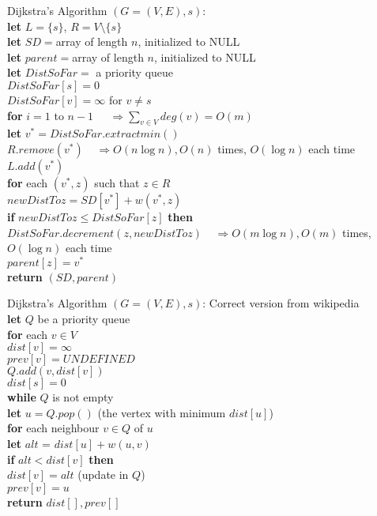 \documentclass[twoside]{article}
\newcommand{\pc}[1]{\mbox{\textbf{#1}}} %
\begin{document}
\begin{algorithme}
	Dijkstra's Algorithm $(G = (V, E), s)$: \\
	\>\pc{let} $L = \{s\}$, $R = V \setminus \{s\}$\\
	\>\pc{let} $SD = $array of length $n$, initialized to NULL\\
	\>\pc{let} $parent = $array of length $n$, initialized to NULL\\
	\>\pc{let} $DistSoFar = $ a priority queue\\
	\>$DistSoFar[s] = 0$ \\
	\>$DistSoFar[v] = \infty$ for $v \neq s$ \\
	\>\pc{for} $i = 1$ to $n-1$ $\;\;\;\;\Rightarrow \sum_{v\in V}deg(v) = O(m)$\\
	\>\>\pc{let} $v^* = DistSoFar.extractmin()$\\
	\>\>$R.remove(v^*)$$\;\;\;\;\Rightarrow O(n\log n), O(n)$ times, $O(\log n)$ each time\\
	\>\>$L.add(v^*)$\\
	\>\>\pc{for} each $(v^*, z)$ such that $z \in R$\\
	\>\>\> $newDistToz = SD[v^*] + w(v^*, z)$\\
	\>\>\>\pc{if} $newDistToz \leq DistSoFar[z]$ \pc{then}\\
	\>\>\>\>$DistSoFar.decrement(z, newDistToz)$$\;\;\;\;\Rightarrow O(m\log n), O(m)$ times, $O(\log n)$ each time\\
	\>\>\>\>$parent[z] = v^*$\\
	\>\pc{return} $(SD, parent)$
\end{algorithme}

\begin{algorithme}
	Dijkstra's Algorithm $(G = (V, E), s)$: Correct version from wikipedia\\
	\>\pc{let} $Q$ be a priority queue\\
	\>\pc{for} each $v \in V$\\
	\>\>$dist[v] = \infty$\\
	\>\>$prev[v] = UNDEFINED$\\
	\>\>$Q.add(v, dist[v])$\\
	\>$dist[s] = 0$\\
	\>\pc{while} $Q$ is not empty\\
	\>\>\pc{let} $u = Q.pop()$ (the vertex with minimum $dist[u]$)\\
	\>\>\pc{for} each neighbour $v \in Q$ of $u$\\
	\>\>\>\pc{let} $alt$ = $dist[u] + w(u, v)$\\
	\>\>\>\pc{if} $alt < dist[v]$ \pc{then}\\
	\>\>\>\>$dist[v] = alt$ (update in $Q$)\\
	\>\>\>\>$prev[v] = u$\\
	\>\pc{return} $dist[], prev[]$
\end{algorithme}
\end{document}
